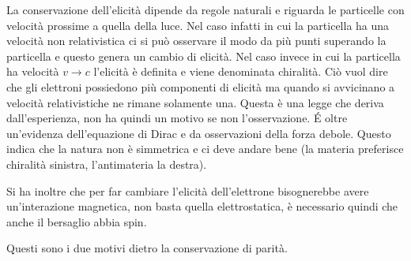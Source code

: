 La conservazione dell'elicità dipende da regole naturali e riguarda le particelle con velocità prossime a quella della luce.
Nel caso infatti in cui la particella ha una velocità non relativistica ci si può osservare il modo da più punti superando la particella e questo genera un cambio di elicità.
Nel caso invece in cui la particella ha velocità $v\to c$ l'elicità è definita e viene denominata chiralità.
Ciò vuol dire che gli elettroni possiedono più componenti di elicità ma quando si avvicinano a velocità relativistiche ne rimane solamente una. Questa è una legge che deriva dall'esperienza, non ha quindi un motivo se non l'osservazione.
\'E oltre un'evidenza dell'equazione di Dirac e da osservazioni della forza debole.
Questo indica che la natura non è simmetrica e ci deve andare bene (la materia preferisce chiralità sinistra, l'antimateria la destra).

Si ha inoltre che per far cambiare l'elicità dell'elettrone bisognerebbe avere un'interazione magnetica, non basta quella elettrostatica, è necessario quindi che anche il bersaglio abbia spin. 

Questi sono i due motivi dietro la conservazione di parità.

